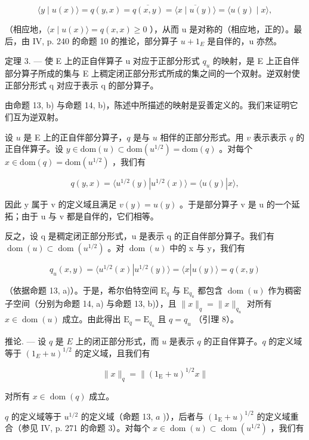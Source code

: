 \[
\langle y \mid u (x) \rangle = q (y, x) = \overline {{q (x , y)}} = \overline {{\langle x \mid u (y) \rangle}} = \langle u (y) \mid x \rangle ,
\]

（相应地，\(\langle x \mid u(x) \rangle = q(x, x) \geqslant 0\) ），从而 u 是对称的（相应地，正的）。最后，由 IV, p. 240 的命题 10 的推论，部分算子 \(u + 1_{E}\) 是自伴的，u 亦然。

定理 3. --- 使 E 上的正自伴算子 u 对应于正部分形式 \(q_u\) 的映射，是 E 上正自伴部分算子所成的集与 E 上稠定闭正部分形式所成的集之间的一个双射。逆双射使正部分形式 q 对应于表示 q 的部分算子。

由命题 13, b) 与命题 14, b)，陈述中所描述的映射是妥善定义的。我们来证明它们互为逆双射。

设 \(u\) 是 E 上的正自伴部分算子，\(q\) 是与 \(u\) 相伴的正部分形式。用 \(v\) 表示表示 \(q\) 的正自伴算子。设 \(y \in \mathrm{dom}(u) \subset \mathrm{dom}(u^{1/2}) = \mathrm{dom}(q)\) 。对每个 \(x \in \mathrm{dom}(q) = \mathrm{dom}(u^{1/2})\) ，我们有

\[
q (y, x) = \langle u ^ {1 / 2} (y) | u ^ {1 / 2} (x) \rangle = \langle u (y) | x \rangle ,
\]

因此 y 属于 v 的定义域且满足 \(v(y) = u(y)\) 。于是部分算子 v 是 u 的一个延拓；由于 u 与 v 都是自伴的，它们相等。

反之，设 q 是稠定闭正部分形式，u 是表示 q 的正自伴部分算子。我们有 \(\operatorname{dom}(u) \subset \operatorname{dom}(u^{1/2})\) 。对 \(\operatorname{dom}(u)\) 中的 x 与 y，我们有

\[
q _ {u} (x, y) = \langle u ^ {1 / 2} (x) | u ^ {1 / 2} (y) \rangle = \langle x | u (y) \rangle = q (x, y)
\]

（依据命题 13, a)）。于是，希尔伯特空间 \(\mathrm{E}_q\) 与 \(\mathrm{E}_{q_u}\) 都包含 \(\operatorname{dom}(u)\) 作为稠密子空间（分别为命题 14, a) 与命题 13, b)），且 \(\|x\|_q = \|x\|_{q_u}\) 对所有 \(x \in \operatorname{dom}(u)\) 成立。由此得出 \(\mathrm{E}_q = \mathrm{E}_{q_u}\) 且 \(q = q_u\) （引理 8）。

推论. --- 设 \(q\) 是 \(E\) 上的闭正部分形式，而 \(u\) 是表示 \(q\) 的正自伴算子。\(q\) 的定义域等于 \((1_{E} + u)^{1/2}\) 的定义域，且我们有

\[
\| x \| _ {q} = \| (1 _ {\mathrm{E}} + u) ^ {1 / 2} x \|
\]

对所有 \(x \in \operatorname{dom}(q)\) 成立。

\(q\) 的定义域等于 \(u^{1/2}\) 的定义域（命题 13, \(a\) )），后者与 \((1_{\mathrm{E}} + u)^{1/2}\) 的定义域重合（参见 IV, p. 271 的命题 3）。对每个 \(x \in \operatorname{dom}(u) \subset \operatorname{dom}(u^{1/2})\) ，我们有

